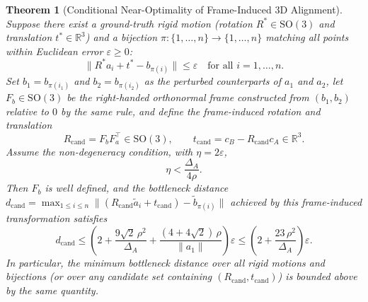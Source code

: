 \documentclass[11pt]{article}
\newtheorem{thm}{Theorem}
\begin{document}
\begin{thm}[Conditional Near-Optimality of Frame-Induced 3D Alignment]
Suppose there exist a ground-truth rigid motion (rotation $R^* \in \mathrm{SO}(3)$ and translation $t^* \in \mathbb{R}^3$) and a bijection $\pi : \{1,\dots,n\} \to \{1,\dots,n\}$ matching all points within Euclidean error $\varepsilon \ge 0$:
\[
\|R^* a_i + t^* - b_{\pi(i)}\| \le \varepsilon \quad \text{for all } i = 1,\dots,n.
\]
Set $b_1 = b_{\pi(i_1)}$ and $b_2 = b_{\pi(i_2)}$ as the perturbed counterparts of $a_1$ and $a_2$, let $F_b \in \mathrm{SO}(3)$ be the right-handed orthonormal frame constructed from $(b_1, b_2)$ relative to $0$ by the same rule, and define the frame-induced rotation and translation
\[
R_{\mathrm{cand}} = F_b F_a^\top \in \mathrm{SO}(3), \qquad t_{\mathrm{cand}} = c_B - R_{\mathrm{cand}} c_A \in \mathbb{R}^3.
\]
Assume the non-degeneracy condition, with $\eta = 2\varepsilon$,
\[
\eta < \frac{\Delta_A}{4\rho}.
\]
Then $F_b$ is well defined, and the bottleneck distance $d_{\mathrm{cand}} = \max_{1 \le i \le n} \|(R_{\mathrm{cand}} \tilde{a}_i + t_{\mathrm{cand}}) - \tilde{b}_{\pi(i)}\|$ achieved by this frame-induced transformation satisfies
\[
d_{\mathrm{cand}} \le \left(2 + \frac{9\sqrt{2}\,\rho^2}{\Delta_A} + \frac{(4+4\sqrt{2})\,\rho}{\|a_1\|}\right)\varepsilon \le \left(2 + \frac{23\,\rho^2}{\Delta_A}\right)\varepsilon.
\]
In particular, the minimum bottleneck distance over all rigid motions and bijections (or over any candidate set containing $(R_{\mathrm{cand}}, t_{\mathrm{cand}})$) is bounded above by the same quantity.
\end{thm}
\end{document}
